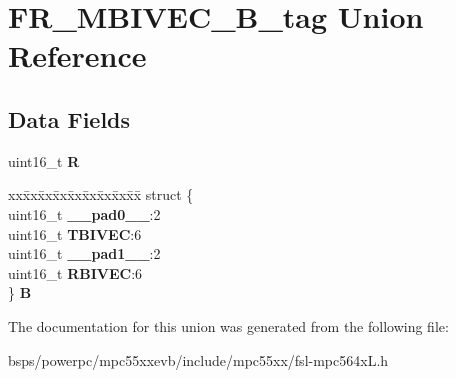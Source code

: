 \hypertarget{unionFR__MBIVEC__16B__tag}{}\section{F\+R\+\_\+\+M\+B\+I\+V\+E\+C\+\_\+B\+\_\+tag Union Reference}
\label{unionFR__MBIVEC__16B__tag}
\subsection*{Data Fields}
\begin{DoxyCompactItemize}
\item 
\mbox{\label{unionFR__MBIVEC__16B__tag_a10fc31005b0458e674ad1b3c94f75194}} 
uint16\+\_\+t {\bfseries R}
\item 
\mbox{\label{unionFR__MBIVEC__16B__tag_a2d8ecd35f6882f82a358c78d9289a59f}} 
\begin{tabbing}
xx\=xx\=xx\=xx\=xx\=xx\=xx\=xx\=xx\=\kill
struct \{\\
\>uint16\_t {\bfseries \_\_pad0\_\_}:2\\
\>uint16\_t {\bfseries TBIVEC}:6\\
\>uint16\_t {\bfseries \_\_pad1\_\_}:2\\
\>uint16\_t {\bfseries RBIVEC}:6\\
\} {\bfseries B}\\

\end{tabbing}\end{DoxyCompactItemize}


The documentation for this union was generated from the following file\+:\begin{DoxyCompactItemize}
\item 
bsps/powerpc/mpc55xxevb/include/mpc55xx/fsl-\/mpc564x\+L.\+h\end{DoxyCompactItemize}
